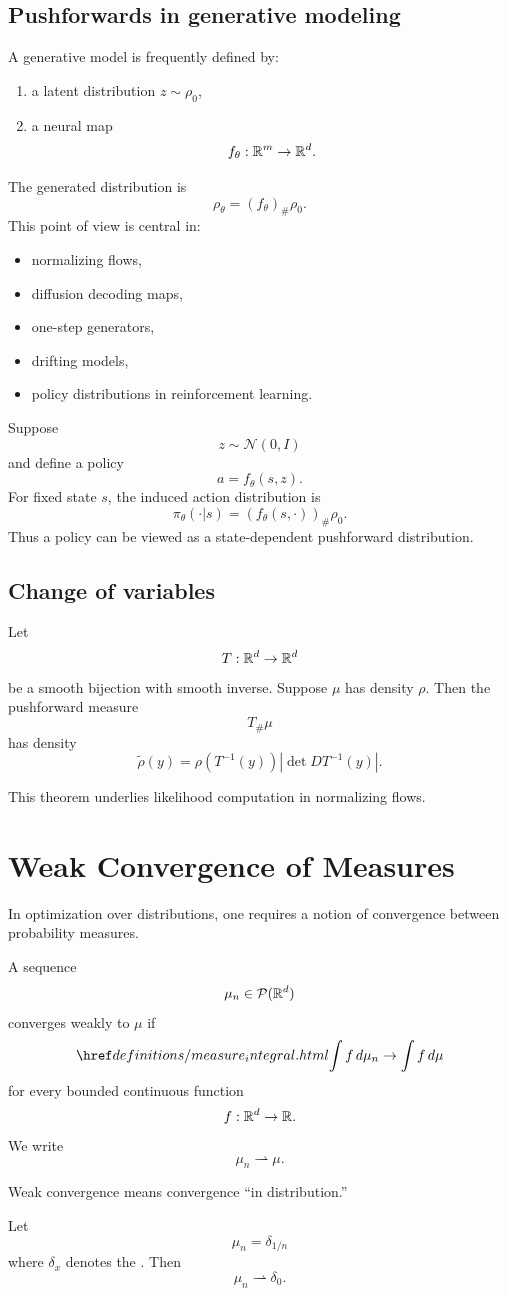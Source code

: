 \subsection{Pushforwards in generative modeling}
A generative model is frequently defined by:
\begin{enumerate}[label=(\roman*)]
    \item a latent distribution $z \sim \rho_0$,
    \item a neural map
    \[
    f_\theta : \mathbb{R}^m \to \mathbb{R}^d.
    \]
\end{enumerate}
The generated distribution is
\[
\rho_\theta = (f_\theta)_{\#}\rho_0.
\]
This point of view is central in:
\begin{itemize}
    \item normalizing flows,
    \item diffusion decoding maps,
    \item one-step generators,
    \item drifting models,
    \item policy distributions in reinforcement learning.
\end{itemize}
\begin{example}
Suppose
\[
z \sim \mathcal N(0,I)
\]
and define a policy
\[
a = f_\theta(s,z).
\]
For fixed state $s$, the induced action distribution is
\[
\pi_\theta(\cdot|s)
=
(f_\theta(s,\cdot))_{\#}\rho_0.
\]
Thus a policy can be viewed as a state-dependent pushforward distribution.
\end{example}
\subsection{Change of variables}
\begin{theorem}
Let
\[
T : \mathbb{R}^d \to \mathbb{R}^d
\]
be a smooth bijection with smooth inverse. Suppose $\mu$ has density $\rho$. Then the pushforward measure
\[
T_{\#}\mu
\]
has density
\[
\tilde \rho(y)
=
\rho(T^{-1}(y))
\left|
\det DT^{-1}(y)
\right|.
\]
\end{theorem}
This theorem underlies likelihood computation in normalizing flows.
\section{Weak Convergence of Measures}
In optimization over distributions, one requires a notion of convergence between probability measures.
\begin{definition}
A sequence
\[
\mu_n \in \mathcal{P}(\mathbb{R}^d)
\]
converges weakly to $\mu$ if
\[
\definitionlink{measure_integral}{\int f\,d\mu_n}
\to
\int f\,d\mu
\]
for every bounded continuous function
\[
f : \mathbb{R}^d \to \mathbb{R}.
\]
We write
\[
\mu_n \rightharpoonup \mu.
\]
\end{definition}
\begin{remark}
Weak convergence means convergence ``in distribution.''
\end{remark}
\begin{example}
Let
\[
\mu_n = \delta_{1/n}
\]
where $\delta_x$ denotes the . Then
\[
\mu_n \rightharpoonup \delta_0.
\]
\end{example}

